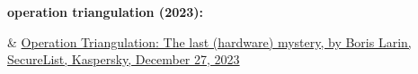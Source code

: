 \documentclass[a4paper]{article}
\begin{document}
	\noindent\textbf{operation triangulation (2023):}
	\begin{easylist}[itemize]
	& \href{https://securelist.com/operation-triangulation-the-last-hardware-mystery/111669/}{Operation Triangulation: The last (hardware) mystery, by Boris Larin, SecureList, Kaspersky, December 27, 2023}
	\end{easylist}		

	\bigskip\noindent
\end{document}
